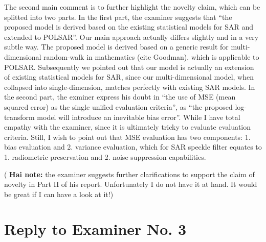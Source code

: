 \documentclass{article}
\begin{document}
The second main comment is to further highlight the novelty claim, which can be splitted into two parts.
In the first part, the examiner suggests that ``the proposed model is derived based on the existing statistical models for SAR and extended to POLSAR''.
Our main approach actually differs slightly and in a very subtle way.
The proposed model is derived based on a generic result for multi-dimensional random-walk in mathematics (cite Goodman), which is applicable to POLSAR.
Subsequently we pointed out that our model is actually an extension of existing statistical models for SAR,
  since our multi-dimensional model, when collapsed into single-dimension, matches perfectly with existing SAR models.
In the second part, the exminer express his doubt in ``the use of MSE (mean squared error) as the single unified evaluation criteria'',
  as ``the proposed log-transform model will introduce an inevitable bias error''.
While I have total empathy with the examiner, since it is ultimately tricky to evaluate evaluation criteria.
Still, I wish to point out that MSE evaluation has two components: 1. bias evaluation and 2. variance evaluation,
  which for SAR speckle filter equates to 1. radiometric preservation and 2. noise suppression capabilities.

( \textbf{ Hai note: }  the examiner suggests further clarifications to support the claim of novelty in Part II of his report.
Unfortunately I do not have it at hand.
It would be great if I can have a look at it!)
  
\section*{Reply to Examiner No. 3}

\begin{replyheader}
\end{replyheader}  
\end{document}
